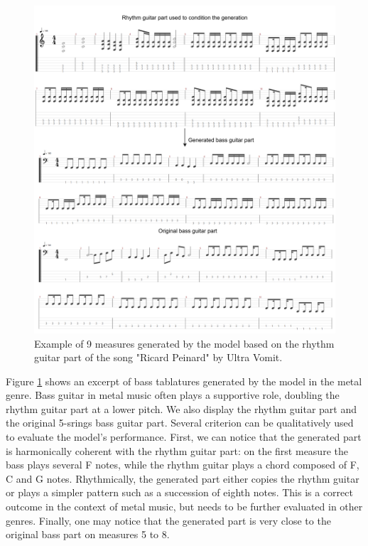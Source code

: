\begin{figure}[!ht]
    \centering
    \includegraphics[width=0.9\linewidth]{../images-figures/gen_ricard_peinard.png}
    \caption{Example of 9 measures generated by the model based on the rhythm guitar part of the song "Ricard Peinard" by Ultra Vomit.}
    \label{fig:gen_ricard_peinard}
\end{figure}

Figure \ref{fig:gen_ricard_peinard} shows an excerpt of bass tablatures generated by the model in the metal genre.
Bass guitar in metal music often plays a supportive role, doubling the rhythm guitar part at a lower pitch.
We also display the rhythm guitar part and the original 5-srings bass guitar part.
Several criterion can be qualitatively used to evaluate the model's performance.
First, we can notice that the generated part is harmonically coherent with the rhythm guitar part:
on the first measure the bass plays several F notes, while the rhythm guitar plays a chord composed of F, C and G notes.
Rhythmically, the generated part either copies the rhythm guitar or plays a simpler pattern such as a succession of eighth notes.
This is a correct outcome in the context of metal music, but needs to be further evaluated in other genres.
Finally, one may notice that the generated part is very close to the original bass part on measures 5 to 8.

